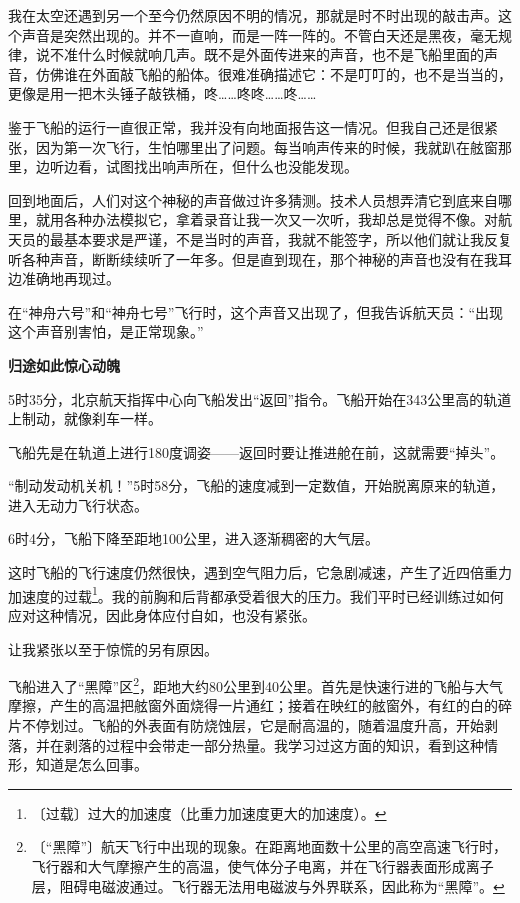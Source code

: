 \documentclass[12pt,UTF-8,openany]{ctexbook}
\begin{document}
\begin{normalsize}
    我在太空还遇到另一个至今仍然原因不明的情况，那就是时不时出现的敲击声。这个声音是突然出现的。并不一直响，而是一阵一阵的。不管白天还是黑夜，毫无规律，说不准什么时候就响几声。既不是外面传进来的声音，也不是飞船里面的声音，仿佛谁在外面敲飞船的船体。很难准确描述它：不是叮叮的，也不是当当的，更像是用一把木头锤子敲铁桶，咚……咚咚……咚……
    
    鉴于飞船的运行一直很正常，我并没有向地面报告这一情况。但我自己还是很紧张，因为第一次飞行，生怕哪里出了问题。每当响声传来的时候，我就趴在舷窗那里，边听边看，试图找出响声所在，但什么也没能发现。
    
    回到地面后，人们对这个神秘的声音做过许多猜测。技术人员想弄清它到底来自哪里，就用各种办法模拟它，拿着录音让我一次又一次听，我却总是觉得不像。对航天员的最基本要求是严谨，不是当时的声音，我就不能签字，所以他们就让我反复听各种声音，断断续续听了一年多。但是直到现在，那个神秘的声音也没有在我耳边准确地再现过。
    
    在“神舟六号”和“神舟七号”飞行时，这个声音又出现了，但我告诉航天员：“出现这个声音别害怕，是正常现象。”
    
    \begin{large}\textbf{归途如此惊心动魄}\end{large}
    
    5时35分，北京航天指挥中心向飞船发出“返回”指令。飞船开始在343公里高的轨道上制动，就像刹车一样。
    
    飞船先是在轨道上进行180度调姿——返回时要让推进舱在前，这就需要“掉头”。
    
    “制动发动机关机！”5时58分，飞船的速度减到一定数值，开始脱离原来的轨道，进入无动力飞行状态。
    
    6时4分，飞船下降至距地100公里，进入逐渐稠密的大气层。
    
    这时飞船的飞行速度仍然很快，遇到空气阻力后，它急剧减速，产生了近四倍重力加速度的过载\footnote{〔过载〕过大的加速度（比重力加速度更大的加速度）。}。我的前胸和后背都承受着很大的压力。我们平时已经训练过如何应对这种情况，因此身体应付自如，也没有紧张。
    
    让我紧张以至于惊慌的另有原因。
    
    飞船进入了“黑障”区\footnote{〔“黑障”〕航天飞行中出现的现象。在距离地面数十公里的高空高速飞行时，飞行器和大气摩擦产生的高温，使气体分子电离，并在飞行器表面形成离子层，阻碍电磁波通过。飞行器无法用电磁波与外界联系，因此称为“黑障”。}，距地大约80公里到40公里。首先是快速行进的飞船与大气摩擦，产生的高温把舷窗外面烧得一片通红；接着在映红的舷窗外，有红的白的碎片不停划过。飞船的外表面有防烧蚀层，它是耐高温的，随着温度升高，开始剥落，并在剥落的过程中会带走一部分热量。我学习过这方面的知识，看到这种情形，知道是怎么回事。
    

\end{normalsize}
\end{document}
